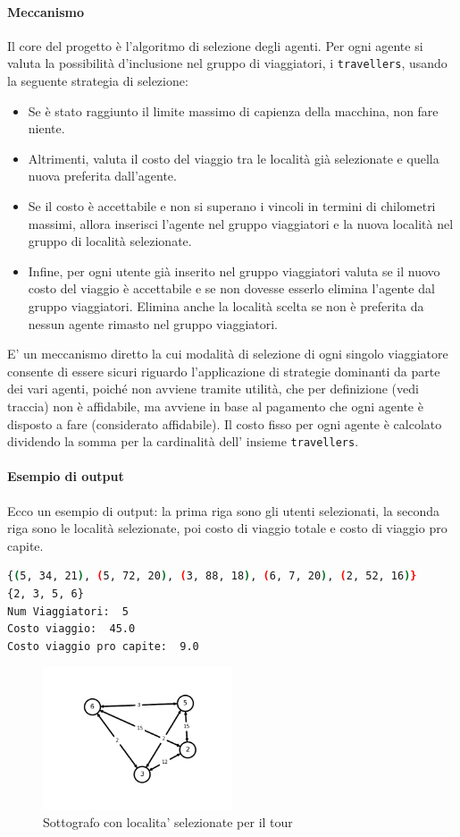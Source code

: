 \documentclass{article}
\begin{document}
\paragraph*{Meccanismo}
Il core del progetto è l'algoritmo di selezione degli agenti. Per ogni agente si valuta la possibilità d'inclusione nel gruppo di viaggiatori, i \verb|travellers|, usando la seguente strategia di selezione:
\begin{itemize}
  \item Se è stato raggiunto il limite massimo di capienza della macchina, non fare niente.
  \item Altrimenti, valuta il costo del viaggio tra le località già selezionate e quella nuova preferita dall'agente.
  \item Se il costo è accettabile e non si superano i vincoli in termini di chilometri massimi, allora inserisci l'agente nel gruppo viaggiatori e la nuova località nel gruppo di località selezionate.
  \item Infine, per ogni utente già inserito nel gruppo viaggiatori valuta se il nuovo costo del viaggio è accettabile e se non dovesse esserlo elimina l'agente dal gruppo viaggiatori. Elimina anche la località scelta se non è preferita da nessun agente rimasto nel gruppo viaggiatori.
\end{itemize}
E' un meccanismo diretto la cui modalità di selezione di ogni singolo viaggiatore consente di essere sicuri riguardo l'applicazione di strategie dominanti da parte dei vari agenti, poiché non avviene tramite utilità, che per definizione (vedi traccia) non è affidabile, ma avviene in base al pagamento che ogni agente è disposto a fare (considerato affidabile).
Il costo fisso per ogni agente è calcolato dividendo la somma per la cardinalità dell' insieme \verb|travellers|.
\paragraph*{Esempio di output}
Ecco un esempio di output: la prima riga sono gli utenti selezionati, la seconda riga sono le località selezionate, poi costo di viaggio totale e costo di viaggio pro capite.
\begin{lstlisting}[language=bash]
{(5, 34, 21), (5, 72, 20), (3, 88, 18), (6, 7, 20), (2, 52, 16)}
{2, 3, 5, 6}
Num Viaggiatori:  5
Costo viaggio:  45.0
Costo viaggio pro capite:  9.0
\end{lstlisting}

\begin{figure}[h]
  \centering
  \includegraphics[width=0.50\textwidth]{img/graphOutput.png}
  \caption{Sottografo con localita' selezionate per il tour}\label{fig:graphOutput.png}
\end{figure}
\clearpage
\pagebreak
\end{document}
